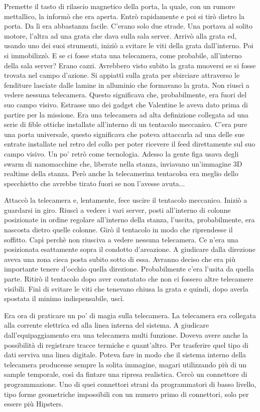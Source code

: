     Premette il tasto di rilascio magnetico della porta, la quale, con un rumore mettallico, la informò che era aperta.
    Entrò rapidamente e poi si tirò dietro la porta. Da lì era abbastanza facile. C'erano solo due strade. Una portava
    al solito motore, l'altra ad una grata che dava sulla sala server. Arrivò alla grata ed, usando uno dei suoi
    strumenti, iniziò a svitare le viti della grata dall'interno. Poi si immobilizzò. E se ci fosse stata una telecamera, come
    probabile, all'interno della sala server? Erano cazzi. Avrebbero visto subito la grata muoversi se si fosse trovata
    nel campo d'azione. Si appiattì sulla grata per sbirciare attraverso le fenditure lasciate dalle lamine in alluminio
    che formavano la grata. Non riuscì a vedere nessuna telecamera. Questo significava che, probabilmente, era fuori del
    suo campo visivo. Estrasse uno dei gadget che Valentine le aveva dato prima di partire per la missione. Era una
    telecamera ad alta definizione collegata ad una serie di fible ottiche installate all'interno di un tentacolo
    meccanico. C'era pure una porta universale, questo significava che poteva attaccarla ad una delle sue entrate
    installate nel retro del collo per poter ricevere il feed direttamente sul suo campo visivo. Un po' retrò come
    tecnologia. Adesso la gente figa usava degli swarm di nanomacchine che, liberate nella stanza, inviavano un'immagine
    3D realtime della stanza. Però anche la telecamerina tentacolsa era meglio dello specchietto che avrebbe tirato
    fuori se non l'avesse avuta...

    Attaccò la telecamera e, lentamente, fece uscire il tentacolo meccanico. Iniziò a guardarsi in giro. Riuscì a vedere
    i vari server, posti all'interno di colonne posizionate in ordine regolare all'interno della stanza, l'uscita,
    probabilmente, era nascosta dietro quelle colonne. Girò il tentacolo in modo che riprendesse il soffitto. Capì
    perchè non riusciva a vedere nessuna telecamera. Ce n'era una posizionata esattamente sopra il condotto d'areazione.
    A giudicare dalla direzione aveva una zona cieca posta subito sotto di essa. Avranno deciso che era più importante
    tenere d'occhio quella direzione. Probabilmente c'era l'usita da quella parte. Ritirò il tentacolo dopo aver
    constatato che non ci fossero altre telecamere visibili. Finì di svitare le viti che tenevano chiusa la grata e
    quindi, dopo averla spostata il minimo indispensabile, uscì.

    Era ora di praticare un po' di magia sulla telecamera. La telecamera era collegata alla corrente elettrica ed alla
    linea interna del sistema. A giudicare dall'equipaggiamento era una telecamera multi funzione. Doveva avere anche la
    possibilità di registrare tracce termiche e quant'altro. Per trasferire quel tipo di dati serviva una linea
    digitale. Poteva fare in modo che il sistema interno della telecamera producesse sempre la solita immagine, magari
    utilizzando più di un sample temporale, così da fintare una ripresa realistica. Cercò un connettore di
    programmazione. Uno di quei connettori strani da programmatori di basso livello, tipo forme geometriche impossibili
    con un numero primo di connettori, solo per essere più Hipsters.

